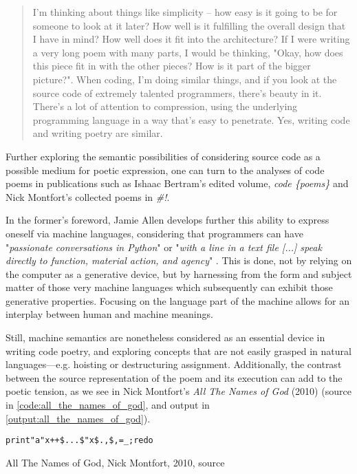 \begin{quote}
  I'm thinking about things like simplicity -- how easy is it going to be for someone to look at it later? How well is it fulfilling the overall design that I have in mind? How well does it fit into the architecture? If I were writing a very long poem with many parts, I would be thinking, "Okay, how does this piece fit in with the other pieces? How is it part of the bigger picture?". When coding, I'm doing similar things, and if you look at the source code of extremely talented programmers, there's beauty in it. There's a lot of attention to compression, using the underlying programming language in a way that's easy to penetrate. Yes, writing code and writing poetry are similar.  \citep{jeiss_poetry_2002}
\end{quote}

Further exploring the semantic possibilities of considering source code as a possible medium for poetic expression, one can turn to the analyses of code poems in publications such as Ishaac Bertram's edited volume, \emph{code \{poems\}} and Nick Montfort's collected poems in \emph{\#!}.

In the former's foreword, Jamie Allen develops further this ability to express oneself via machine languages, considering that programmers can have "\emph{passionate conversations in Python}" or "\emph{with a line in a text file [...] speak directly to function, material action, and agency}" \citep{bertram_code_2012}. This is done, not by relying on the computer as a generative device, but by harnessing from the form and subject matter of those very machine languages which subsequently can exhibit those generative properties. Focusing on the language part of the machine allows for an interplay between human and machine meanings.

Still, machine semantics are nonetheless considered as an essential device in writing code poetry, and exploring concepts that are not easily grasped in natural languages—e.g. hoisting or destructuring assignment. Additionally, the contrast between the source representation of the poem and its execution can add to the poetic tension, as we see in Nick Montfort's \emph{All The Names of God} (2010) (source in \ref{code:all_the_names_of_god}, and output in \ref{output:all_the_names_of_god}).

\begin{listing}
  \begin{verbatim}
print"a"x++$...$"x$.,$,=_;redo
\end{verbatim}
  \caption{All The Names of God, Nick Montfort, 2010, source}
  \label{code:all_the_names_of_god}
\end{listing}


